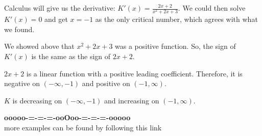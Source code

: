 \documentclass{ximera}
\begin{document}
Calculus will give us the derivative: $K'(x) = \frac{2x+2}{x^2+2x+3}$.  We could then solve $K'(x) = 0$ and get $x=-1$ as the only critical number, which agrees with what we found. 



We showed above that $x^2+2x+3$ was a positive function.  So, the sign of $K'(x)$ is the same as the sign of $2x+2$. 

$2x+2$ is a linear function with a positive leading coefficient.  Therefore, it is negative on $(-\infty, -1)$  and positive on $(-1, \infty)$. 


$K$ is decreasing on $(-\infty, -1)$ and increasing on $(-1, \infty)$.











\begin{center}
\textbf{\textcolor{green!50!black}{ooooo-=-=-=-ooOoo-=-=-=-ooooo}} \\

more examples can be found by following this link\\ 

\end{center}
\end{document}
